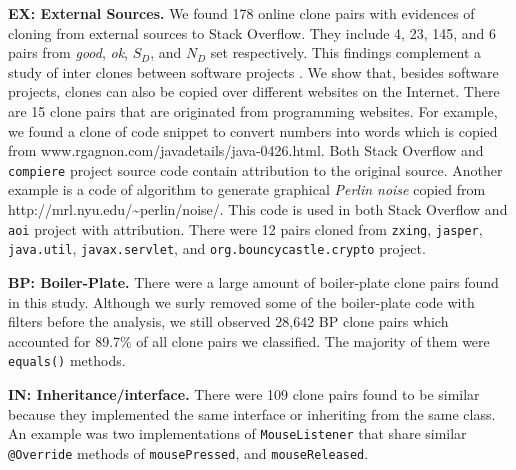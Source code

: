\documentclass[sigconf,review, anonymous]{acmart}
\begin{document}
\textbf{EX: External Sources.} We found 178 online clone pairs with evidences of cloning from external sources to Stack Overflow. They include 4, 23, 145, and 6 pairs from \textit{good}, \textit{ok}, $S_D$, and $N_D$ set respectively.
This findings complement a study of inter clones between software projects \cite{Svajlenko2014}. We show that, besides software projects, clones can also be copied over different websites on the Internet. There are 15 clone pairs that are originated from programming websites. For example, we found a clone of code snippet to convert numbers into words which is copied from www.rgagnon.com/javadetails/java-0426.html. Both Stack Overflow and {\small\texttt{compiere}} project source code contain attribution to the original source. Another example is a code of algorithm to generate graphical \textit{Perlin noise} copied from http://mrl.nyu.edu/\textasciitilde perlin/noise/. This code is used in both Stack Overflow and {\small\texttt{aoi}} project with attribution. %
There were 12 pairs cloned from {\small\texttt{zxing}}, {\small\texttt{jasper}}, {\small\texttt{java.util}}, {\small\texttt{javax.servlet}}, and {\small\texttt{org.bouncycastle.crypto}} project.

\textbf{BP: Boiler-Plate.} There were a large amount of boiler-plate clone pairs found in this study. Although we surly removed some of the boiler-plate code with filters before the analysis, we still observed 28,642 BP clone pairs which accounted for 89.7\% of all clone pairs we classified. The majority of them were {\small{\texttt{equals()}}} methods.

\textbf{IN: Inheritance/interface.} There were 109 clone pairs found to be similar because they implemented the same interface or inheriting from the same class. An example was two implementations of {\small{\texttt{MouseListener}}} that share similar {\small\texttt{@Override}} methods of {\small\texttt{mousePressed}}, and {\small\texttt{mouseReleased}}. 
\end{document}
